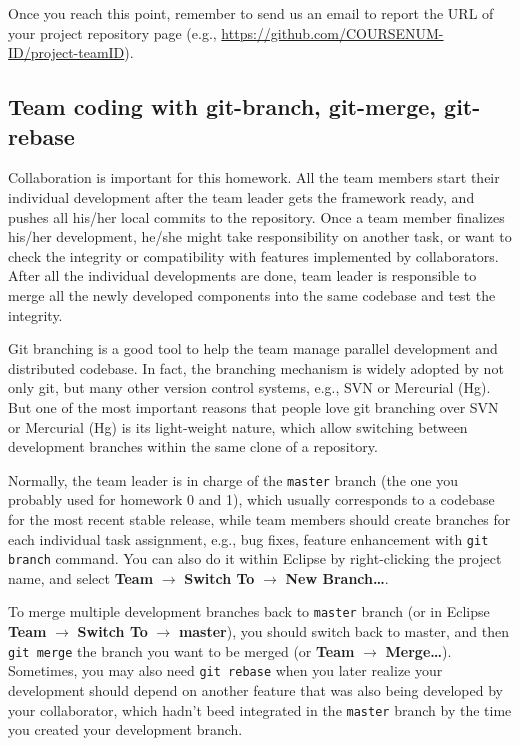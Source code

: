 Once you reach this point, remember to send us an email to report the URL of
your project repository page (e.g., \url{https://github.com/COURSENUM-ID/project-teamID}).

\subsection{Team coding with git-branch, git-merge, git-rebase}

Collaboration is important for this homework. All the team members start their
individual development after the team leader gets the framework ready, and
pushes all his/her local commits to the repository. Once a team member finalizes
his/her development, he/she might take responsibility on another task, or want
to check the integrity or compatibility with features implemented by
collaborators. After all the individual developments are done, team leader is
responsible to merge all the newly developed components into the same codebase
and test the integrity.

Git branching is a good tool to help the team manage parallel development and
distributed codebase. In fact, the branching mechanism is widely adopted by not
only git, but many other version control systems, e.g., SVN or Mercurial (Hg).
But one of the most important reasons that people love git branching over SVN or
Mercurial (Hg) is its light-weight nature, which allow switching between
development branches within the same clone of a repository.

Normally, the team leader is in charge of the \texttt{master} branch (the one
you probably used for homework 0 and 1), which usually corresponds to a codebase
for the most recent stable release, while team members should create branches
for each individual task assignment, e.g., bug fixes, feature enhancement with
\texttt{git branch} command. You can also do it within Eclipse by right-clicking
the project name, and select \textbf{Team} $\rightarrow$ \textbf{Switch To}
$\rightarrow$ \textbf{New Branch\ldots}.

To merge multiple development branches back to \texttt{master} branch (or in
Eclipse \textbf{Team} $\rightarrow$ \textbf{Switch To} $\rightarrow$
\textbf{master}), you should switch back to master, and then \texttt{git merge}
the branch you want to be merged (or \textbf{Team} $\rightarrow$
\textbf{Merge\ldots}). Sometimes, you may also need \texttt{git rebase} when you
later realize your development should depend on another feature that was also
being developed by your collaborator, which hadn't beed integrated in the
\texttt{master} branch by the time you created your development branch.

